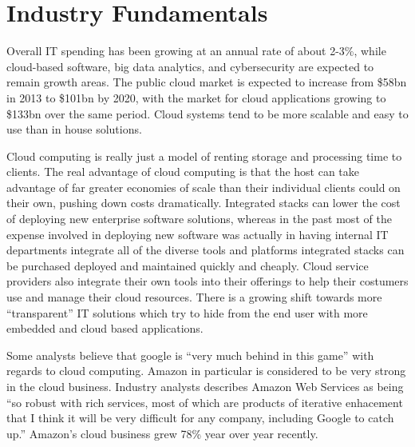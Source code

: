 \section*{Industry Fundamentals}

Overall IT spending has been growing at an annual rate of about 2-3\%, while cloud-based software, big data analytics, and cybersecurity are expected to remain growth areas.\autocite[]{CloudAnalyticsCybersecurityApplication}\autocite[]{CIOIntro}
The public cloud market is expected to increase from \$58bn in 2013 to \$101bn by 2020, with the market for cloud applications growing to \$133bn over the same period.\autocite[]{CIOIntro}
Cloud systems tend to be more scalable and easy to use than in house solutions.\autocite[]{CIOIntro}

Cloud computing is really just a model of renting storage and processing time to clients.\autocite[]{AftermathOfIntegratedStack}
The real advantage of cloud computing is that the host can take advantage of far greater economies of scale than their individual clients could on their own, pushing down costs dramatically.\autocite[]{AftermathOfIntegratedStack}
Integrated stacks can lower the cost of deploying new enterprise software solutions, whereas in the past most of the expense involved in deploying new software was actually in having internal IT departments integrate all of the diverse tools and platforms integrated stacks can be purchased deployed and maintained quickly and cheaply.\autocite[]{AftermathOfIntegratedStack}
Cloud service providers also integrate their own tools into their offerings to help their costumers use and manage their cloud resources.\autocite[]{AftermathOfIntegratedStack}
There is a growing shift towards more ``transparent'' IT solutions which try to hide from the end user with more embedded and cloud based applications.\autocite[]{OptimismInnovation}

Some analysts believe that google is ``very much behind in this game'' with regards to cloud computing.\autocite[]{GoogleCloudBoost}
Amazon in particular is considered to be very strong in the cloud business.  Industry analysts describes Amazon Web Services as being ``so robust with rich services, most of which are products of iterative enhacement that I think it will be very difficult for any company, including Google to catch up.''\autocite[]{GoogleCloudBoost}
Amazon's cloud business grew 78\% year over year recently.\autocite[]{GoogleCloudBoost}


